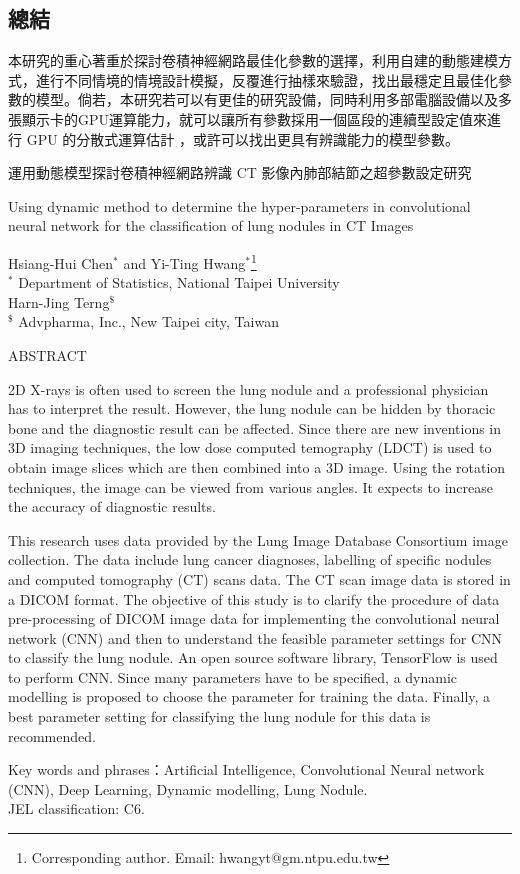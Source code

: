 \documentclass[12pt, a4paper]{article} 				%
\begin{document}
\subsection{總結}
本研究的重心著重於探討卷積神經網路最佳化參數的選擇，利用自建的動態建模方式，進行不同情境的情境設計模擬，反覆進行抽樣來驗證，找出最穩定且最佳化參數的模型。倘若，本研究若可以有更佳的研究設備，同時利用多部電腦設備以及多張顯示卡的GPU運算能力，就可以讓所有參數採用一個區段的連續型設定值來進行 GPU 的分散式運算估計 \cite{Rendon-Gonzalez2016}，或許可以找出更具有辨識能力的模型參數。



運用動態模型探討卷積神經網路辨識 CT 影像內肺部結節之超參數設定研究
\clearpage
\begin{center}
Using dynamic method to determine the hyper-parameters in convolutional neural network for the classification of lung nodules in CT Images
\end{center}
\vspace*{0.15cm}
\begin{center}
Hsiang-Hui Chen$^{*}$ and Yi-Ting Hwang$^{*}$\footnote{Corresponding author. Email: hwangyt@gm.ntpu.edu.tw}\\
$^{*}$ Department of Statistics, National Taipei University\\
Harn-Jing Terng$^{\$}$\\
$^{\$}$ Advpharma, Inc., New Taipei city, Taiwan
\end{center}

\vspace*{0.25cm}
\begin{center}
ABSTRACT
\end{center}

2D X-rays is often used to screen the lung nodule and a professional physician has to interpret the result. However, the lung nodule can be hidden by thoracic bone and the diagnostic result can be affected. Since there are new inventions in 3D imaging techniques, the low dose computed temography (LDCT) is used to obtain image slices which are then combined into a 3D image. Using the rotation techniques, the image can be viewed from various angles. It expects to increase the accuracy of diagnostic results. 

This research uses data provided by the Lung Image Database Consortium image collection. The data include lung cancer diagnoses, labelling of specific nodules and computed tomography (CT) scans data. The CT scan image data is stored in a DICOM format. The objective of this study is to clarify the procedure of data pre-processing of DICOM image data for implementing the convolutional neural network (CNN) and then to understand the feasible parameter settings for CNN to classify the lung nodule. An open source software library, TensorFlow is used to perform CNN. Since many parameters have to be specified, a dynamic modelling is proposed to choose the parameter for training the data. Finally, a best parameter setting for classifying the lung nodule for this data is recommended.

\vspace*{0.5cm}
\noindent
Key words and phrases：Artificial Intelligence, Convolutional Neural network (CNN), Deep Learning, Dynamic modelling, Lung Nodule.\\
JEL classification: C6.
\end{document}

